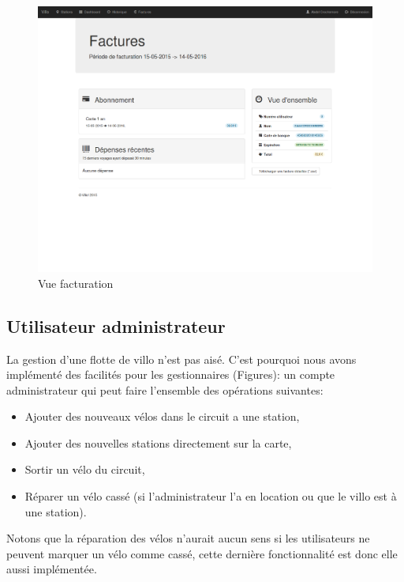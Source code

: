 \documentclass[a4paper,10pt]{article}
\begin{document}
\begin{figure}[H]
  \centering
  \includegraphics[scale=0.2]{factures.png}
  \caption{\label{fig:factures} Vue facturation}
\end{figure}

\subsection{Utilisateur administrateur}
La gestion d'une flotte de villo n'est pas aisé. C'est pourquoi nous avons implémenté
des facilités pour les gestionnaires (Figures): un compte administrateur qui peut faire
l'ensemble des opérations suivantes: 
\begin{itemize}
	\item Ajouter des nouveaux vélos dans le circuit a une station,
	\item Ajouter des nouvelles stations directement sur la carte,
	\item Sortir un vélo du circuit,
	\item Réparer un vélo cassé (si l'administrateur l'a en location ou que le villo est à une station).
\end{itemize}

Notons que la réparation des vélos n'aurait aucun sens si les utilisateurs ne peuvent
marquer un vélo comme cassé, cette dernière fonctionnalité est donc elle aussi implémentée.
\end{document}
